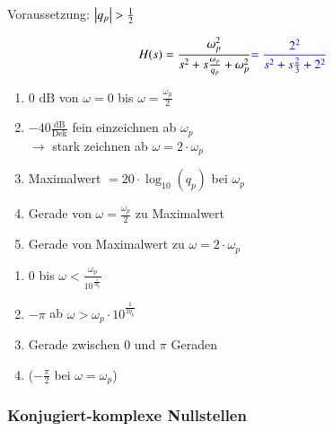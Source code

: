 \begin{minipage}[t]{0.48\columnwidth}
    \raggedright
    \begin{center}
        Voraussetzung: $\left|q_p\right| > \frac{1}{2}$
    \end{center}
    $$ H(s) = \frac{\omega_p^2}{s^2 + s \frac{\omega_p}{q_p} + \omega_p^2} {\color{blue}= \frac{2^2}{s^2 + s \frac{2}{3} + 2^2}} $$

    
\end{minipage}
\hfill
\begin{minipage}[t]{0.48\columnwidth}
        \begin{enumerate}
            \item 0 $\text{dB}$ von $\omega=0$ bis $\omega=\frac{\omega_p}{2}$
            \item $-40\frac{\text{dB}}{\text{Dek}}$ fein einzeichnen ab $\omega_p$\\
            $\rightarrow$ stark zeichnen ab $\omega = 2 \cdot \omega_p$
            \item Maximalwert $= 20\cdot \log_{10}(q_p)$ bei $\omega_p$
            \item Gerade von $\omega=\frac{\omega_p}{2}$ zu Maximalwert 
            \item Gerade von Maximalwert zu $\omega = 2 \cdot \omega_p$\\
        \end{enumerate}
        \begin{enumerate}
            \item 0 bis $\omega < \frac{\omega_p}{10^{\frac{1}{2 q_p}}}$
            \item $- \pi$ ab $\omega > \omega_p \cdot 10^{\frac{1}{2 q_p}}$
            \item Gerade zwischen $0$ und $\pi$ Geraden
            \item ($- \frac{\pi}{2}$ bei $\omega = \omega_p$)
        \end{enumerate}
\end{minipage}


\subsubsection{Konjugiert-komplexe Nullstellen} 

